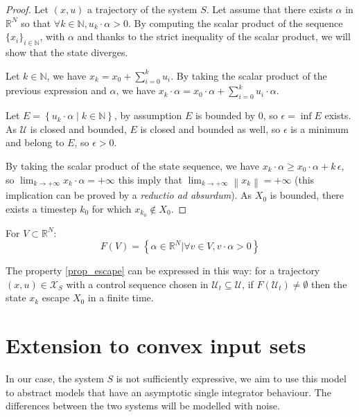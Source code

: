 \documentclass{article}
\theoremstyle{named}
\begin{document}
\begin{proof}
Let $(x,u)$ a trajectory of the system $S$.
Let assume that there exists $\alpha$ in $\mathbb{R}^N$ so that $\forall k \in \mathbb{N}, u_k \cdot \alpha > 0$.
By computing the scalar product of the sequence $\{x_i \}_{i \in \mathbb{N}}$, with $\alpha$ and thanks to the strict inequality of the scalar product, we will show that the state diverges.

Let $k \in \mathbb{N}$, we have $x_{k} = x_0 + \sum_{i=0}^{k} u_i$.
By taking the scalar product of the previous expression and $\alpha$, we have $x_k \cdot \alpha = x_0 \cdot \alpha + \sum_{i=0}^{k} u_i \cdot \alpha$.
 
Let $E = \left \{ u_k \cdot \alpha \mid k \in \mathbb{N} \right \}$, by assumption $E$ is bounded by 0, so $\epsilon  = \inf E$ exists. As $\mathcal{U}$ is closed and bounded, $E$ is closed and bounded as well, so $\epsilon$ is a minimum and belong to $E$, so $\epsilon > 0$.

By taking the scalar product of the state sequence, we have $x_k \cdot \alpha \geq x_0 \cdot \alpha + k \, \epsilon$, so $\lim_{k \rightarrow + \infty} x_k \cdot \alpha = +\infty$ this imply that $\lim_{k \rightarrow + \infty} \left \| x_k \right \| = +\infty$ (this implication can be proved by a \textit{reductio ad absurdum}).
As $X_0$ is bounded, there exists a timestep $k_0$ for which $x_{k_0} \notin X_0$.
\end{proof}

For $V \subset \mathbb{R}^N$:
$$F(V) = \left \{ \alpha \in \mathbb{R}^N| \forall v \in V, v \cdot \alpha >0 \right \}$$

The property \ref{prop_escape} can be expressed in this way: for a trajectory $(x,u) \in \mathcal{X}_S$ with a control sequence chosen in $\mathcal{U}_t \subseteq \mathcal{U}$, if $F(\mathcal{U}_t) \neq \emptyset$ then the state $x_k$ escape $X_0$ in a finite time.

\section{Extension to convex input sets}\label{sec_ext_escape}

In our case, the system $S$ is not sufficiently expressive, 
we aim to use this model to abstract models that have an asymptotic single integrator behaviour.
The differences between the two systems will be modelled with noise.
\end{document}
